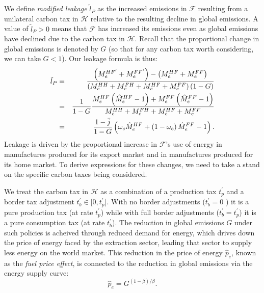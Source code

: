 \documentclass[notitlepage,12pt]{article}
\begin{document}
We define \emph{modified leakage} $\tilde{l}_{P}$ as the increased emissions
in $\mathcal{F}$ resulting from a unilateral carbon tax in $\mathcal{H}$
relative to the resulting decline in global emissions. A value of $\tilde{l}%
_{P}>0$ means that $\mathcal{F}$ has increased its emissions even as global
emissions have declined due to the carbon tax in $\mathcal{H}$. Recall that
the proportional change in global emissions is denoted by $G$ (so that for
any carbon tax worth considering, we can take $G<1$). Our leakage formula is
thus:%
\begin{eqnarray*}
\tilde{l}_{P} &=&\frac{\left( M_{e}^{HF^{\prime }}+M_{e}^{FF^{\prime
}}\right) -\left( M_{e}^{HF}+M_{e}^{FF}\right) }{\left(
M_{e}^{HH}+M_{e}^{FH}+M_{e}^{HF}+M_{e}^{FF}\right) \left( 1-G\right) } \\
&=&\frac{1}{1-G}\frac{M_{e}^{HF}\left( \hat{M}_{e}^{HF}-1\right)
+M_{e}^{FF}\left( \hat{M}_{e}^{FF}-1\right) }{%
M_{e}^{HH}+M_{e}^{FH}+M_{e}^{HF}+M_{e}^{FF}} \\
&=&\frac{1-\bar{j}}{1-G}\left( \omega _{c}\hat{M}_{e}^{HF}+\left( 1-\omega
_{c}\right) \hat{M}_{e}^{FF}-1\right) .
\end{eqnarray*}%
Leakage is driven by the proportional increase in $\mathcal{F}$'s use of
energy in manufactures produced for its export market and in manufactures
produced for its home market. To derive expressions for these changes, we
need to take a stand on the specific carbon taxes being considered.

We treat the carbon tax in $\mathcal{H}$ as a combination of a production
tax $t_{p}^{\prime }$ and a border tax adjustment $t_{b}^{\prime }\in
\lbrack 0,t_{p}^{\prime }]$. With no border adjustments ($t_{b}^{\prime }=0$%
) it is a pure production tax (at rate $t_{p}^{\prime }$) while with full
border adjustments ($t_{b}^{\prime }=t_{p}^{\prime }$) it is a pure
consumption tax (at rate $t_{b}^{\prime }$). The reduction in global
emissions $G$ under such policies is acheived through reduced demand for
energy, which drives down the price of energy faced by the extraction
sector, leading that sector to supply less energy on the world market. This
reduction in the price of energy $\hat{p}_{e}$, known as the \emph{fuel
price effect}, is connected to the reduction in global emissions via the
energy supply curve:%
\begin{equation}
\hat{p}_{e}=G^{(1-\beta )/\beta }.  \label{fuel price effect}
\end{equation}
\end{document}
